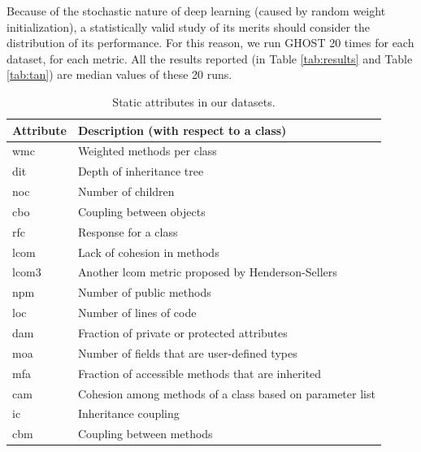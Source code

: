 \documentclass[10pt,compsoc,twocolumn]{IEEEtran}
\begin{document}
Because of the stochastic nature of deep learning (caused by random weight initialization), a statistically valid study of its merits should consider the distribution of its performance. For this reason, we run GHOST 20 times for each dataset, for each metric. All the results reported (in Table \ref{tab:results} and Table \ref{tab:tan}) are median values of these 20 runs.


\begin{table}
    \centering
    \caption{Static attributes in our  datasets.}
    \begin{tabularx}{\linewidth}{lL}
    \toprule
        Attribute   & Description (with respect to a class) \\
        \midrule
        wmc & Weighted methods per class \cite{chidamber1994metrics} \\
        dit & Depth of inheritance tree \cite{chidamber1994metrics} \\
        noc & Number of children \cite{chidamber1994metrics} \\
        cbo & Coupling between objects \cite{chidamber1994metrics} \\
        rfc & Response for a class \cite{chidamber1994metrics} \\
        lcom & Lack of cohesion in methods \cite{chidamber1994metrics} \\
        lcom3 & Another lcom metric proposed by Henderson-Sellers \cite{henderson1996coupling} \\
        npm & Number of public methods \cite{bansiya2002hierarchical} \\
        loc & Number of lines of code \cite{bansiya2002hierarchical} \\
        dam & Fraction of private or protected attributes \cite{bansiya2002hierarchical} \\
        moa & Number of fields that are user-defined types \cite{bansiya2002hierarchical} \\
     mfa & Fraction of accessible methods that are inherited \cite{bansiya2002hierarchical} \\
        cam & Cohesion among methods of a class based on parameter list \cite{bansiya2002hierarchical} \\
     ic & Inheritance coupling \cite{tang1999empirical} \\
        cbm & Coupling between methods \cite{tang1999empirical} \\

\end{tabularx}
\end{table}
\end{document}
